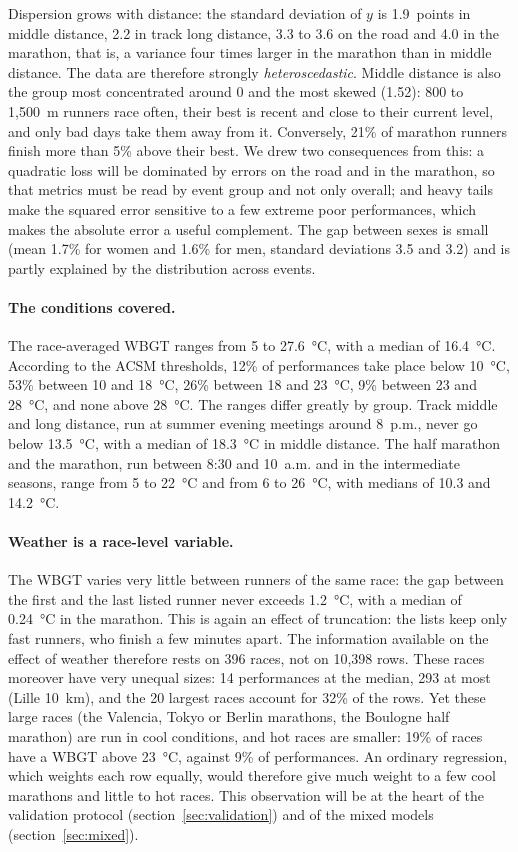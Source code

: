 \documentclass[11pt,a4paper]{article}
\begin{document}
Dispersion grows with distance: the standard deviation of $y$ is 1.9~points in middle distance, 2.2 in track long
distance, 3.3 to 3.6 on the road and 4.0 in the marathon, that is, a variance four times larger in the marathon than in
middle distance. The data are therefore strongly \emph{heteroscedastic}. Middle distance is also the group most
concentrated around 0 and the most skewed (1.52): 800 to 1,500~m runners race often, their best is recent and close to
their current level, and only bad days take them away from it. Conversely, 21\% of marathon runners finish more than
5\% above their best. We drew two consequences from this: a quadratic loss will be dominated by errors on the road and
in the marathon, so that metrics must be read by event group and not only overall; and heavy tails make the squared
error sensitive to a few extreme poor performances, which makes the absolute error a useful complement. The gap
between sexes is small (mean 1.7\% for women and 1.6\% for men, standard deviations 3.5 and 3.2) and is partly
explained by the distribution across events.

\paragraph{The conditions covered.} The race-averaged WBGT ranges from 5 to 27.6~°C, with a median of 16.4~°C.
According to the ACSM thresholds, 12\% of performances take place below 10~°C, 53\% between 10 and 18~°C, 26\% between
18 and 23~°C, 9\% between 23 and 28~°C, and none above 28~°C. The ranges differ greatly by group. Track middle and long
distance, run at summer evening meetings around 8~p.m., never go below 13.5~°C, with a median of 18.3~°C in middle
distance. The half marathon and the marathon, run between 8:30 and 10~a.m. and in the intermediate seasons, range from
5 to 22~°C and from 6 to 26~°C, with medians of 10.3 and 14.2~°C.

\paragraph{Weather is a race-level variable.} The WBGT varies very little between runners of the same race: the gap
between the first and the last listed runner never exceeds 1.2~°C, with a median of 0.24~°C in the marathon. This is
again an effect of truncation: the lists keep only fast runners, who finish a few minutes apart. The information
available on the effect of weather therefore rests on 396 races, not on 10,398 rows. These races moreover have very
unequal sizes: 14 performances at the median, 293 at most (Lille 10~km), and the 20 largest races account for 32\% of
the rows. Yet these large races (the Valencia, Tokyo or Berlin marathons, the Boulogne half marathon) are run in cool
conditions, and hot races are smaller: 19\% of races have a WBGT above 23~°C, against 9\% of performances. An ordinary
regression, which weights each row equally, would therefore give much weight to a few cool marathons and little to
hot races. This observation will be at the heart of the validation protocol (section~\ref{sec:validation}) and of the
mixed models (section~\ref{sec:mixed}).
\end{document}
